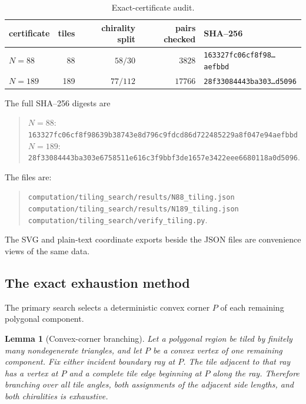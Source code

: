 \documentclass[11pt]{amsart}
\newtheorem{lemma}[theorem]{Lemma}
\theoremstyle{definition}
\theoremstyle{remark}
\newcommand{\pathcode}[1]{\nolinkurl{#1}}
\begin{document}
\begin{table}[ht]
\centering
\small
\begin{tabular}{@{}lrrrl@{}}
\toprule
certificate & tiles & chirality split & pairs checked & SHA--256 \\
\midrule
$N=88$  & 88  & $58/30$  & $3828$ &
\texttt{163327fc06cf8f98\ldots aefbbd} \\
$N=189$ & 189 & $77/112$ & $17766$ &
\texttt{28f33084443ba303\ldots d5096} \\
\bottomrule
\end{tabular}
\caption{Exact-certificate audit.}
\end{table}

\noindent The full SHA--256 digests are
\begin{quote}\scriptsize
$N=88$:\quad
\pathcode{163327fc06cf8f98639b38743e8d796c9fdcd86d722485229a8f047e94aefbbd}\\
$N=189$:\quad
\pathcode{28f33084443ba303e6758511e616c3f9bbf3de1657e3422eee6680118a0d5096}.
\end{quote}

The files are:
\begin{quote}\small
\pathcode{computation/tiling_search/results/N88_tiling.json}\\
\pathcode{computation/tiling_search/results/N189_tiling.json}\\
\pathcode{computation/tiling_search/verify_tiling.py}.
\end{quote}
The SVG and plain-text coordinate exports beside the JSON files are
convenience views of the same data.

\subsection{The exact exhaustion method}\label{app:negative}

The primary search selects a deterministic convex corner $P$ of each
remaining polygonal component.

\begin{lemma}[Convex-corner branching]\label{lem:corner-branching}
Let a polygonal region be tiled by finitely many nondegenerate triangles, and
let $P$ be a convex vertex of one remaining component.  Fix either incident
boundary ray at $P$.  The tile adjacent to that ray has a vertex at $P$ and a
complete tile edge beginning at $P$ along the ray.  Therefore branching over
all tile angles, both assignments of the adjacent side lengths, and both
chiralities is exhaustive.
\end{lemma}
\end{document}
